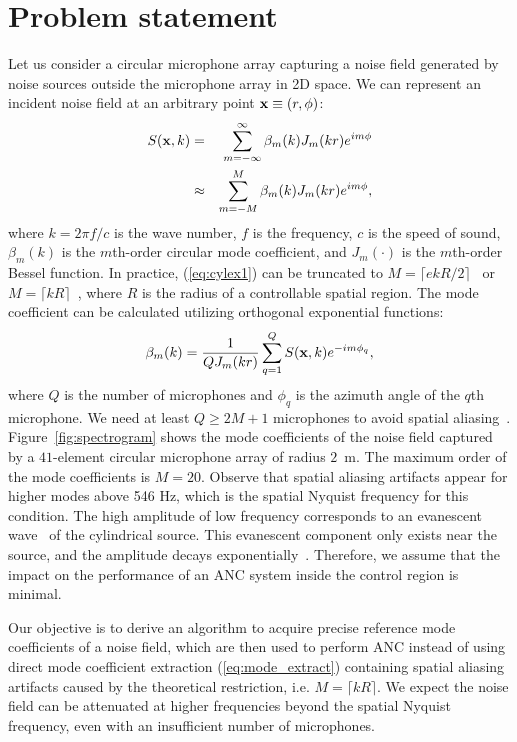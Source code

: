 \documentclass{article}
\begin{document}
\section{Problem statement}
\label{sec:formula}
%
Let us consider a circular microphone array capturing a noise field generated by noise sources outside the microphone array in 2D space.
We can represent an incident noise field at an arbitrary
point ${\bf x} \equiv (r, \phi)$:
%
\begin{eqnarray}
S({\bf x},k) &=& \sum^{\infty}_{m=-\infty}\beta_m(k) J_m(kr) e^{im \phi} \label{eq:cylex1} \\
&\approx& \sum^{M}_{m=-M}\beta_m(k) J_m(kr) e^{im \phi} ,
\label{eq:cylex2}
\end{eqnarray}
%
where $k = 2 \pi f / c$ is the wave number, $f$ is the frequency, $c$ is the speed of sound, $\beta_m(k)$ is the $m$th-order circular mode coefficient, and $J_m(\cdot)$ is the $m$th-order Bessel function. In practice, (\ref{eq:cylex1}) can be truncated to $M = \lceil ekR/2 \rceil$~\cite{kennedy2007intrinsic} or $M = \lceil kR \rceil$~\cite{ward2001reproduction}, where $R$ is the radius of a controllable spatial region.
The mode coefficient can be calculated utilizing orthogonal exponential functions:
%
\begin{equation}
\beta_m(k) = \frac{1}{Q J_m(kr)} \sum^{Q}_{q=1} S({\bf x},k) e^{-im \phi_q} ,
\label{eq:mode_extract}
\end{equation}
%
where $Q$ is the number of microphones and $\phi_q$ is the azimuth angle
of the $q$th microphone.
We need at least $Q \ge 2M+1$ microphones to avoid spatial aliasing~\cite{samarasinghe2014wavefield}.
Figure~\ref{fig:spectrogram} shows the mode coefficients of
the noise field captured by a  $41$-element circular microphone array of radius $2$~m.
The maximum order of the mode coefficients is $M=20$.
Observe that spatial aliasing artifacts appear
for higher modes above 546 Hz, which is the spatial Nyquist frequency for this condition.
The high amplitude of low frequency corresponds to 
an evanescent wave~\cite{williams1999fourier} of the cylindrical source.
This evanescent component only exists near the source, and the amplitude decays exponentially~\cite{ahrens2012analytic}.
Therefore, we assume that
the impact on the performance of an ANC system inside the control region
is minimal. 

Our objective is to derive an algorithm to acquire precise reference mode coefficients of a noise field, which are then used to perform ANC
instead of using direct mode coefficient extraction (\ref{eq:mode_extract}) containing
spatial aliasing artifacts caused by the theoretical restriction, i.e. $M = \lceil kR \rceil$.
We expect the noise field can be attenuated at higher frequencies beyond the spatial Nyquist frequency, even with an insufficient number of microphones.
\end{document}
